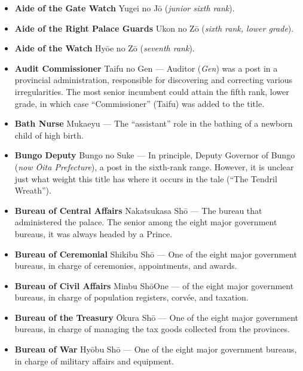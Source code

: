 \documentclass{article}
\begin{document}
\begin{multicols}{2}
\begin{small}
\begin{itemize}[
				label=,
				leftmargin=0em,
				rightmargin=-1.5em,
				itemindent=-2em,
			]
			\item \textbf{Aide of the Gate Watch} Yugei no Jō (\textit{junior sixth rank}).

			\item \textbf{Aide of the Right Palace Guards} Ukon no Zō (\textit{sixth rank, lower grade}).

			\item \textbf{Aide of the Watch} Hyōe no Zō (\textit{seventh rank}).

			\item \textbf{Audit Commissioner} Taifu no Gen --- Auditor (\textit{Gen}) was a post in a provincial administration, responsible for discovering and correcting various irregularities. The most senior incumbent could attain the fifth rank, lower grade, in which case “Commissioner” (Taifu) was added to the title.

			\item \textbf{Bath Nurse} Mukaeyu --- The “assistant” role in the bathing of a newborn child of high birth.

			\item \textbf{Bungo Deputy} Bungo no Suke --- In principle, Deputy Governor of Bungo (\textit{now Ōita Prefecture}), a post in the sixth-rank range. However, it is unclear just what weight this title has where it occurs in the tale (“The Tendril Wreath”).

			\item \textbf{Bureau of Central Affairs} Nakatsukasa Shō --- The bureau that administered the palace. The senior among the eight major government bureaus, it was always headed by a Prince.

			\item \textbf{Bureau of Ceremonial} Shikibu Shō --- One of the eight major government bureaus, in charge of ceremonies, appointments, and awards.

			\item \textbf{Bureau of Civil Affairs} Minbu ShōOne --- of the eight major government bureaus, in charge of population registers, corvée, and taxation.

			\item \textbf{Bureau of the Treasury} Ōkura Shō --- One of the eight major government bureaus, in charge of managing the tax goods collected from the provinces.

			\item \textbf{Bureau of War} Hyōbu Shō --- One of the eight major government bureaus, in charge of military affairs and equipment.


\end{itemize}
\end{small}
\end{multicols}
\end{document}
